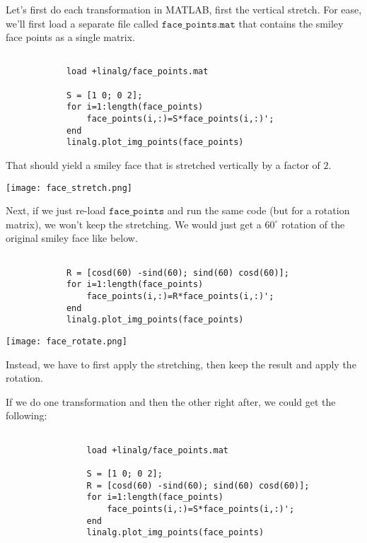 \documentclass{ximera}
\begin{document}
\begin{exploration}
\begin{example}
        Let's first do each transformation in MATLAB, first the vertical stretch. For ease, we'll first load a separate file called $\texttt{face\_points.mat}$ that contains the smiley face points as a single matrix.

        \begin{verbatim}

            load +linalg/face_points.mat
        
            S = [1 0; 0 2];
            for i=1:length(face_points)
                face_points(i,:)=S*face_points(i,:)';
            end
            linalg.plot_img_points(face_points)

        \end{verbatim}

        That should yield a smiley face that is stretched vertically by a factor of $2$.

        \begin{center}
            \texttt{[image: face\_stretch.png]}
        \end{center}

        Next, if we just re-load $\texttt{face\_points}$ and run the same code (but for a rotation matrix), we won't keep the stretching. We would just get a $60^\circ$ rotation of the original smiley face like below.

        \begin{verbatim}

            R = [cosd(60) -sind(60); sind(60) cosd(60)];
            for i=1:length(face_points)
                face_points(i,:)=R*face_points(i,:)';
            end
            linalg.plot_img_points(face_points)
        \end{verbatim}

        \begin{center}
            \texttt{[image: face\_rotate.png]}
        \end{center}

        Instead, we have to first apply the stretching, then keep the result and apply the rotation. 

        If we do one transformation and then the other right after, we could get the following: 

        \begin{verbatim}
                
                load +linalg/face_points.mat
    
                S = [1 0; 0 2];
                R = [cosd(60) -sind(60); sind(60) cosd(60)];
                for i=1:length(face_points)
                    face_points(i,:)=S*face_points(i,:)';
                end
                linalg.plot_img_points(face_points)


\end{verbatim}
\end{example}
\end{exploration}
\end{document}
